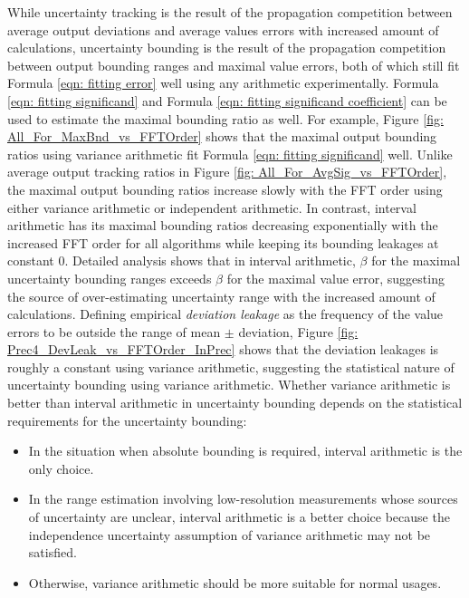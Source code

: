 \documentclass[twoside]{article}
\numberwithin{equation}{section}
\begin{document}
While uncertainty tracking is the result of the propagation competition between average output deviations and average values errors with increased amount of calculations, uncertainty bounding is the result of the propagation competition between output bounding ranges and maximal value errors, both of which still fit Formula \eqref{eqn: fitting error} well using any arithmetic experimentally.  Formula \eqref{eqn: fitting significand} and Formula \eqref{eqn: fitting significand coefficient}  can be used to estimate the maximal bounding ratio as well.  For example, Figure \ref{fig: All_For_MaxBnd_vs_FFTOrder} shows that the maximal output bounding ratios using variance arithmetic fit Formula \eqref{eqn: fitting significand} well.  Unlike average output tracking ratios in Figure \ref{fig: All_For_AvgSig_vs_FFTOrder}, the maximal output bounding ratios increase slowly with the FFT order using either variance arithmetic or independent arithmetic.  In contrast, interval arithmetic has its maximal bounding ratios decreasing exponentially with the increased FFT order for all algorithms while keeping its bounding leakages at constant 0.  Detailed analysis shows that in interval arithmetic, $\beta$ for the maximal uncertainty bounding ranges exceeds $\beta$ for the maximal value error, suggesting the source of over-estimating uncertainty range with the increased amount of calculations.  Defining empirical \emph{deviation leakage} as the frequency of the value errors to be outside the range of mean $\pm$ deviation, Figure \ref{fig: Prec4_DevLeak_vs_FFTOrder_InPrec} shows that the deviation leakages is roughly a constant using variance arithmetic, suggesting the statistical nature of uncertainty bounding using variance arithmetic.  Whether variance arithmetic is better than interval arithmetic in uncertainty bounding depends on the statistical requirements for the uncertainty bounding:
\begin{itemize}
\item  In the situation when absolute bounding is required, interval arithmetic is the only choice.

\item  In the range estimation \cite{Statistical_Methods} involving low-resolution measurements whose sources of uncertainty are unclear, interval arithmetic is a better choice because the independence uncertainty assumption of variance arithmetic may not be satisfied. 

\item  Otherwise, variance arithmetic should be more suitable for normal usages.  
\end{itemize}
\end{document}
